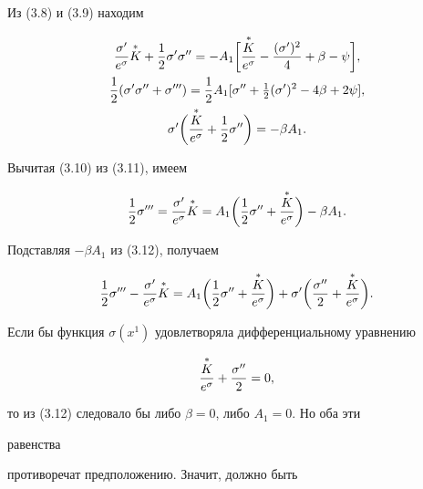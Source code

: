 Из (3.8) и (3.9) находим 


\begin{gather} 


\frac{\sigma'}{e^\sigma}\up{K}+\frac{1}{2}\sigma'\sigma''= 


-A_1\bigg[\frac{\up{K}}{e^\sigma}- 


\frac{(\sigma')^2}{4}+\beta-\psi\bigg],\\ 


\frac{1}{2}(\sigma'\sigma''+\sigma''')=\frac{1}{2}A_1 


[\sigma''+\tfrac{1}{2}(\sigma')^2-4\beta+2\psi],\\ 


\sigma'\bigg(\frac{\up{K}}{e^\sigma}+\frac{1}{2}\sigma''\bigg) 


=-\beta A_1. 


\end{gather} 


Вычитая (3.10) из (3.11), имеем 


$$ 


\frac{1}{2}\sigma'''=\frac{\sigma'}{e^\sigma}\up{K}= 


A_1\bigg(\frac{1}{2}\sigma''+\frac{\up{K}}{e^\sigma}\bigg) 


-\beta A_1. 


$$ 


Подставляя $-\beta A_1$ из (3.12), получаем 


\begin{equation} 


\frac{1}{2}\sigma'''-\frac{\sigma'}{e^\sigma}\up{K}=A_1 


\bigg(\frac{1}{2}\sigma''+\frac{\up{K}}{e^\sigma}\bigg)+ 


\sigma'\bigg(\frac{\sigma''}{2}+\frac{\up{K}}{e^\sigma}\bigg). 


\end{equation} 


Если бы функция $\sigma(x^1)$ удовлетворяла дифференциальному уравнению 


\begin{equation} 


\frac{\up{K}}{e^\sigma}+\frac{\sigma''}{2}=0, 


\end{equation} 


то из (3.12) следовало бы либо $\beta=0$, либо $A_1=0$. Но оба эти 


равенства 


противоречат предположению. Значит, должно быть 


